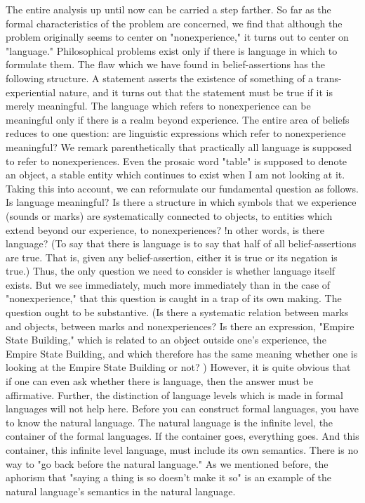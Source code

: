 \documentclass[10pt,twoside]{memoir}
\begin{document}
The entire analysis up until now can be carried a step farther. So far as 
the formal characteristics of the problem are concerned, we find that 
although the problem originally seems to center on "nonexperience," it 
turns out to center on "language." Philosophical problems exist only if there 
is language in which to formulate them. The flaw which we have found in 
belief-assertions has the following structure. A statement asserts the 
existence of something of a trans-experiential nature, and it turns out that 
the statement must be true if it is merely meaningful. The language which 
refers to nonexperience can be meaningful only if there is a realm beyond 
experience. The entire area of beliefs reduces to one question: are linguistic 
expressions which refer to nonexperience meaningful? We remark 
parenthetically that practically all language is supposed to refer to 
nonexperiences. Even the prosaic word "table" is supposed to denote an 
object, a stable entity which continues to exist when I am not looking at it. 
Taking this into account, we can reformulate our fundamental question as 
follows. Is language meaningful? Is there a structure in which symbols that 
we experience (sounds or marks) are systematically connected to objects, to 
entities which extend beyond our experience, to nonexperiences? !n other 
words, is there language? (To say that there is language is to say that half of 
all belief-assertions are true. That is, given any belief-assertion, either it is 
true or its negation is true.) Thus, the only question we need to consider is 
whether language itself exists. But we see immediately, much more 
immediately than in the case of "nonexperience," that this question is 
caught in a trap of its own making. The question ought to be substantive. (Is 
there a systematic relation between marks and objects, between marks and 
nonexperiences? Is there an expression, "Empire State Building," which is 
related to an object outside one's experience, the Empire State Building, and 
which therefore has the same meaning whether one is looking at the Empire 
State Building or not? ) However, it is quite obvious that if one can even ask 
whether there is language, then the answer must be affirmative. Further, the 
distinction of language levels which is made in formal languages will not help 
here. Before you can construct formal languages, you have to know the 
natural language. The natural language is the infinite level, the container of 
the formal languages. If the container goes, everything goes. And this 
container, this infinite level language, must include its own semantics. There 
is no way to "go back before the natural language." As we mentioned 
before, the aphorism that "saying a thing is so doesn't make it so" is an 
example of the natural language's semantics in the natural language. 
\end{document}
